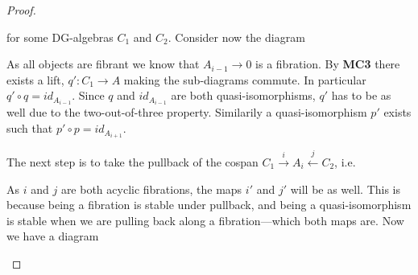 \begin{proof}
\begin{center}
\end{center}
for some DG-algebras $C_1$ and $C_2$. Consider now the diagram
\begin{center}
\end{center}
As all objects are fibrant we know that $A_{i-1}\longrightarrow 0$ is a fibration. By \textbf{MC3}  there exists a lift, $q'\colon C_1\longrightarrow A$ making the sub-diagrams commute. In particular $q'\circ q = id_{A_{i-1}}$. Since $q$ and $id_{A_{i-1}}$ are both quasi-isomorphisms, $q'$ has to be as well due to the two-out-of-three property. Similarily a quasi-isomorphism $p'$ exists such that $p'\circ p = id_{A_{i+1}}$. 

The next step is to take the pullback of the cospan $C_1\overset{i}\rightarrow A_i\overset{j}\leftarrow C_2$, i.e.
\begin{center}
\end{center}
As $i$ and $j$ are both acyclic fibrations, the maps $i'$ and $j'$ will be as well. This is because being a fibration is stable under pullback, and being a quasi-isomorphism is stable when we are pulling back along a fibration---which both maps are. Now we have a diagram

\begin{center}
\end{center}
\end{proof}

